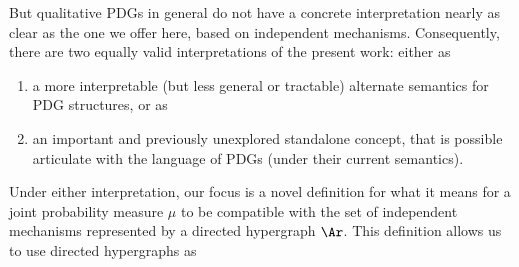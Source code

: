 {{%
But qualitative PDGs in general do not have a concrete interpretation
nearly as clear as the one we offer here, based on independent mechanisms. 
Consequently, there are two equally valid interpretations of the present work: either as
\begin{enumerate}[wide,nosep, label={\textbf{\arabic*.}}]
    \item a more interpretable (but less general or tractable) alternate semantics for PDG structures, or as
    \item 
    an important and previously unexplored standalone concept, that is possible articulate with the language of PDGs (under their current semantics).
\end{enumerate}
Under either interpretation, 
our focus is
a novel definition for what it means for a joint probability 
    measure $\mu$ to be
    compatible
     with
the set of independent mechanisms
represented by
    a directed hypergraph $\Ar$.
This definition allows us to use directed hypergraphs as
}}
